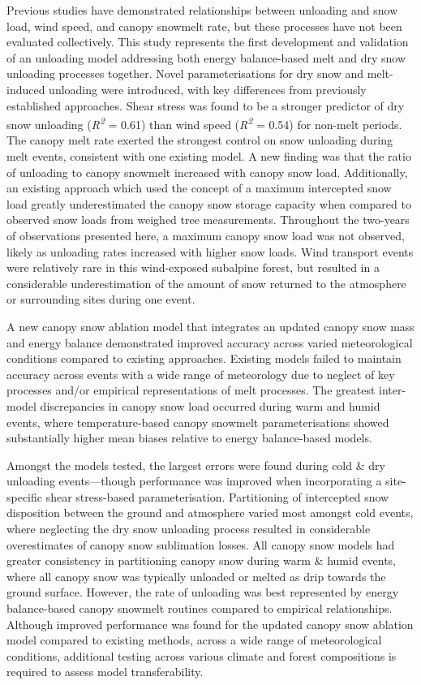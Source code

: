 \documentclass[
]{agujournal2019}
\begin{document}
Previous studies have demonstrated relationships between unloading and
snow load, wind speed, and canopy snowmelt rate, but these processes
have not been evaluated collectively. This study represents the first
development and validation of an unloading model addressing both energy
balance-based melt and dry snow unloading processes together. Novel
parameterisations for dry snow and melt-induced unloading were
introduced, with key differences from previously established approaches.
Shear stress was found to be a stronger predictor of dry snow unloading
(\emph{R\textsuperscript{2}} = 0.61) than wind speed
(\emph{R\textsuperscript{2}} = 0.54) for non-melt periods. The canopy
melt rate exerted the strongest control on snow unloading during melt
events, consistent with one existing model. A new finding was that the
ratio of unloading to canopy snowmelt increased with canopy snow load.
Additionally, an existing approach which used the concept of a maximum
intercepted snow load greatly underestimated the canopy snow storage
capacity when compared to observed snow loads from weighed tree
measurements. Throughout the two-years of observations presented here, a
maximum canopy snow load was not observed, likely as unloading rates
increased with higher snow loads. Wind transport events were relatively
rare in this wind-exposed subalpine forest, but resulted in a
considerable underestimation of the amount of snow returned to the
atmosphere or surrounding sites during one event.

A new canopy snow ablation model that integrates an updated canopy snow
mass and energy balance demonstrated improved accuracy across varied
meteorological conditions compared to existing approaches. Existing
models failed to maintain accuracy across events with a wide range of
meteorology due to neglect of key processes and/or empirical
representations of melt processes. The greatest inter-model
discrepancies in canopy snow load occurred during warm and humid events,
where temperature-based canopy snowmelt parameterisations showed
substantially higher mean biases relative to energy balance-based
models.

Amongst the models tested, the largest errors were found during cold \&
dry unloading events---though performance was improved when
incorporating a site-specific shear stress-based parameterisation.
Partitioning of intercepted snow disposition between the ground and
atmosphere varied most amongst cold events, where neglecting the dry
snow unloading process resulted in considerable overestimates of canopy
snow sublimation losses. All canopy snow models had greater consistency
in partitioning canopy snow during warm \& humid events, where all
canopy snow was typically unloaded or melted as drip towards the ground
surface. However, the rate of unloading was best represented by energy
balance-based canopy snowmelt routines compared to empirical
relationships. Although improved performance was found for the updated
canopy snow ablation model compared to existing methods, across a wide
range of meteorological conditions, additional testing across various
climate and forest compositions is required to assess model
transferability.
\end{document}

